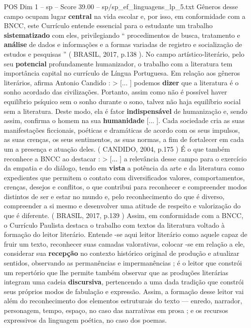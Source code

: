\begin{textsample}{POS Dim 1 – sp – Score 39.00 – sp/sp\_ef\_linguagens\_lp\_5.txt}
Gêneros desse campo ocupam lugar \textbf{central} na vida escolar e, por isso, em conformidade com a BNCC, este Currículo entende essencial para o estudante um trabalho \textbf{sistematizado} com eles, privilegiando “ procedimentos de busca, tratamento e \textbf{análise} de dados e informações e a formas variadas de registro e socialização de estudos e pesquisas ” ( BRASIL, 2017, p.138 ).
No campo artístico-literário, pelo seu \textbf{potencial} profundamente humanizador, o trabalho com a literatura tem importância capital no currículo de Língua Portuguesa.
Em relação aos gêneros literários, afirma Antonio Candido : > [... ] podemos \textbf{dizer} que a literatura é o sonho acordado das civilizações.
Portanto, assim como não é possível haver equilíbrio psíquico sem o sonho durante o sono, talvez não haja equilíbrio social sem a literatura.
Deste modo, ela é fator \textbf{indispensável} de humanização e, sendo assim, confirma o homem na sua \textbf{humanidade} [... ].
Cada sociedade cria as suas manifestações ficcionais, poéticas e dramáticas de acordo com os seus impulsos, as suas crenças, os seus sentimentos, as suas normas, a fim de fortalecer em cada um a presença e atuação deles. ( CANDIDO, 2004, p.175 ) É o que também reconhece a BNCC ao destacar : > [... ] a relevância desse campo para o exercício da empatia e do diálogo, tendo em \textbf{vista} a potência da arte e da literatura como expedientes que permitem o contato com diversificados valores, comportamentos, crenças, desejos e conflitos, o que contribui para reconhecer e compreender modos distintos de ser e estar no mundo e, pelo reconhecimento do que é diverso, compreender a si mesmo e desenvolver uma atitude de respeito e valorização do que é diferente. ( BRASIL, 2017, p.139 ) Assim, em conformidade com a BNCC, o Currículo Paulista destaca o trabalho com textos da literatura voltado à formação do leitor literário.
Entende -se aqui leitor literário como aquele capaz de fruir um texto, reconhecer suas camadas valorativas, colocar -se em relação a ele, considerar sua \textbf{recepção} no contexto histórico original de produção e atualizar sentidos, observando as permanências e impermanências ; é o leitor que constrói um repertório que lhe permite também observar que as produções literárias integram uma cadeia \textbf{discursiva}, pertencendo a uma dada tradição que constrói seus próprios modos de fabulação e expressão.
Assim, a formação desse leitor vai além do reconhecimento dos elementos estruturais do texto — enredo, narrador, personagem, tempo, espaço, no caso das narrativas em prosa ; e os recursos expressivos da linguagem poética, no caso dos poemas.

\end{textsample}
